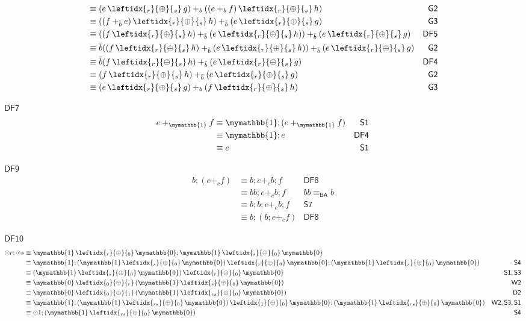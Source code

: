 \documentclass[a4paper,UKenglish,cleveref, autoref, thm-restate]{lipics-v2021}
\newcommand{\BA}{\textsf{BA}}
\newcommand{\WC}[2]{\,\leftidx{_{#1}}{{\oplus}}{_{#2}}\,}
\newcommand{\Ax}[1]{\ensuremath{\mathsf{#1}}}
\newcommand{\bskip}{\mymathbb{1}}
\newcommand{\babort}{\mymathbb{0}}
\theoremstyle{plain}\newtheoremrep{thm}{Theorem}[section]
\begin{document}
\begin{appendixproof}
\begin{align*}
			&\equiv (e \WC{r}{s} g) +_b ((e +_b f)\WC{r}{s} h)&\Ax{G2}\\
			&\equiv ((f +_{\bar b} e)\WC{r}{s} h) +_{\bar b} (e \WC{r}{s} g)&\Ax{G3}\\
			&\equiv ((f \WC{r}{s} h) +_{\bar b} (e \WC{r}{s} h)) +_{\bar b} (e \WC{r}{s} g)&\Ax{DF5}\\
			&\equiv \bar b((f \WC{r}{s} h) +_{\bar b} (e \WC{r}{s} h)) +_{\bar b} (e \WC{r}{s} g)&\Ax{G2}\\
			&\equiv \bar b(f \WC{r}{s} h) +_{\bar b} (e \WC{r}{s} g)&\Ax{DF4}\\
			&\equiv (f \WC{r}{s} h) +_{\bar b} (e \WC{r}{s} g)&\Ax{G2}\\
			&\equiv (e \WC{r}{s} g) +_{b} (f \WC{r}{s} h)&\Ax{G3}
		\end{align*}
		\item[\Ax{DF7}]
		\begin{align*}
			e+_\bskip f &\equiv \bskip;(e+_\bskip f) & \Ax{S1}\\
			&\equiv \bskip;e & \Ax{DF4}\\
			&\equiv e & \Ax{S1}
		\end{align*}
		\item[\Ax{DF9}]
		\begin{align*}
			b;(e +_c f) &\equiv b;e +_c b;f & \Ax{DF8}\\
			&\equiv bb;e +_c b;f & bb \equiv_{\BA} b\\
			&\equiv b;b;e +_c b;f & \Ax{S7}\\
			&\equiv b;(b;e +_c f) & \Ax{DF8}
		\end{align*}
		\item[\Ax{DF10}] 
		\begin{align*}
			\odot r; \odot s &\equiv \bskip \WC{r}{0} \babort ; \bskip \WC{s}{0} \babort &\\
			&\equiv \bskip;(\bskip \WC{s}{0} \babort) \WC{r}{0} \babort;(\bskip \WC{s}{0} \babort) & \Ax{S4}\\
			&\equiv (\bskip \WC{s}{0} \babort) \WC{r}{0} \babort & \Ax{S1,S3}\\
			&\equiv \babort \WC{0}{r} (\bskip \WC{s}{0} \babort) & \Ax{W2}\\
			&\equiv \babort \WC{0}{1} (\bskip \WC{rs}{0} \babort) & \Ax{D2}\\
			&\equiv \bskip;(\bskip \WC{rs}{0} \babort) \WC{1}{0} \babort;(\bskip \WC{rs}{0} \babort) & \Ax{W2, S3, S1}\\
			&\equiv \odot 1;(\bskip \WC{rs}{0} \babort) & \Ax{S4}\\

\end{align*}
\end{appendixproof}
\end{document}

